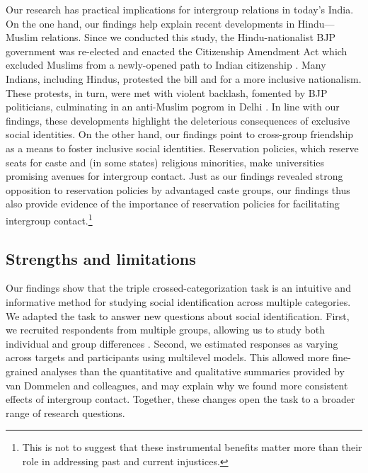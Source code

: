 \documentclass[12pt, a4paper]{article}
\begin{document}
Our research has practical implications for intergroup relations in today’s India. On the one hand, our findings help explain recent developments in Hindu---Muslim relations. Since we conducted this study, the Hindu-nationalist BJP government was re-elected and enacted the Citizenship Amendment Act which excluded Muslims from a newly-opened path to Indian citizenship \parencite{noauthor_citizenship_2019}. Many Indians, including Hindus, protested the bill and for a more inclusive nationalism. These protests, in turn, were met with violent backlash, fomented by BJP politicians, culminating in an anti-Muslim pogrom in Delhi \parencite{kamdar_what_2020}. In line with our findings, these developments highlight the deleterious consequences of exclusive social identities. On the other hand, our findings point to cross-group friendship as a means to foster inclusive social identities. Reservation policies, which reserve seats for caste and (in some states) religious minorities, make universities promising avenues for intergroup contact. Just as our findings revealed strong opposition to reservation policies by advantaged caste groups, our findings thus also provide evidence of the importance of reservation policies for facilitating intergroup contact.\footnote{This is not to suggest that these instrumental benefits matter more than their role in addressing past and current injustices.}

\subsection{Strengths and limitations}

Our findings show that the triple crossed-categorization task \parencite{van_dommelen_construing_2015} is an intuitive and informative method for studying social identification across multiple categories. We adapted the task to answer new questions about social identification. First, we recruited respondents from multiple groups, allowing us to study both individual and group differences \parencite[see also][]{brankovic_social_2016}. Second, we estimated responses as varying across targets and participants using multilevel models. This allowed more fine-grained analyses than the quantitative and qualitative summaries provided by van Dommelen and colleagues, and may explain why we found more consistent effects of intergroup contact. Together, these changes open the task to a broader range of research questions.
\end{document}
